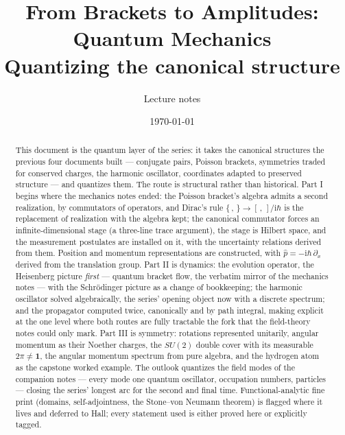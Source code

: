 \documentclass[11pt]{article}
\title{\bfseries From Brackets to Amplitudes:\\
Quantum Mechanics\\[4pt]
\large Quantizing the canonical structure}
\author{Lecture notes}
\date{\today}
\theoremstyle{plain}
\theoremstyle{definition}
\theoremstyle{remark}
\newcommand{\ii}{\mathrm{i}}
\newcommand{\op}[1]{\hat{#1}}
\newcommand{\idop}{\mathbf{1}}  %
\begin{document}
\maketitle

\begin{abstract}
\noindent
This document is the quantum layer of the series: it takes the
canonical structures the previous four documents built --- conjugate
pairs, Poisson brackets, symmetries traded for conserved charges, the
harmonic oscillator, coordinates adapted to preserved structure ---
and quantizes them. The route is structural rather than historical.
Part I begins where the mechanics notes ended: the Poisson bracket's
algebra admits a second realization, by commutators of operators, and
Dirac's rule $\{\,,\,\} \to [\,,\,]/\ii\hbar$ is the replacement of
realization with the algebra kept; the canonical commutator forces an
infinite-dimensional stage (a three-line trace argument), the stage
is Hilbert space, and the measurement postulates are installed on it,
with the uncertainty relations derived from them. Position and
momentum representations are constructed, with
$\op p = -\ii\hbar\,\partial_x$ derived from the translation
group. Part II is dynamics: the evolution operator,
the Heisenberg picture \emph{first} --- quantum bracket flow, the
verbatim mirror of the mechanics notes --- with the Schr\"odinger
picture as a change of bookkeeping; the harmonic oscillator solved
algebraically, the series' opening object now with a discrete
spectrum; and the propagator computed twice, canonically and by path
integral, making explicit at the one level where both routes are
fully tractable the fork that the field-theory notes could only mark.
Part III is symmetry: rotations represented unitarily, angular
momentum as their Noether charges, the $SU(2)$ double cover with its
measurable $2\pi \neq \idop$, the angular momentum spectrum from
pure algebra, and the hydrogen atom as the capstone worked example.
The outlook quantizes the field modes of the companion notes ---
every mode one quantum oscillator, occupation numbers, particles ---
closing the series' longest arc for the second and final time.
Functional-analytic fine print (domains, self-adjointness, the
Stone--von Neumann theorem) is flagged where it lives and
deferred to Hall; every statement used is either proved here or
explicitly tagged.
\end{abstract}

\clearpage
\tableofcontents
\clearpage

\end{document}
